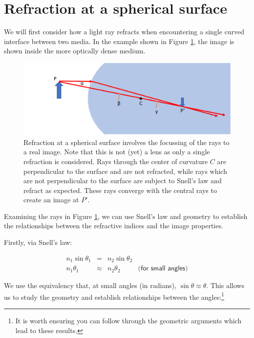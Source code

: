 \documentclass[
]{book}
\begin{document}
\hypertarget{sec-ch16-sphericalsurface1}{%
\section{Refraction at a spherical surface}\label{sec-ch16-sphericalsurface1}}

We will first consider how a light ray refracts when encountering a single curved interface between two media. In the example shown in Figure \ref{fig:ch16-sphericalsurface1}, the image is shown inside the more optically dense medium.

\begin{figure}

{\centering \includegraphics[width=0.7\linewidth]{visualisations/LaTeX/ch16-sphericalsurface} 

}

\caption{Refraction at a spherical surface involves the focussing of the rays to a real image. Note that this is not (yet) a lens as only a single refraction is considered. Rays through the center of curvature $C$ are perpendicular to the surface and are not refracted, while rays which are not perpendicular to the surface are subject to Snell's law and refract as expected. These rays converge with the central rays to create an image at $P'$.}\label{fig:ch16-sphericalsurface1}
\end{figure}

Examining the rays in Figure \ref{fig:ch16-sphericalsurface1}, we can use Snell's law and geometry to establish the relationships between the refractive indices and the image properties.

Firstly, via Snell's law:

\begin{equation}
\begin{array}{rcll}
n_1 \sin \theta_1 &=& n_2 \sin \theta_2 &\\
n_1 \theta_1 &\approx& n_2 \theta_2 & \textsf{(for small angles)}
\end{array}
\label{eq:ch16-lensequation1}
\end{equation}

We use the equivalency that, at small angles (in radians), \(\sin \theta \approx \theta\). This allows us to study the geometry and establish relationships between the angles:\footnote{It is worth ensuring you can follow through the geometric arguments which lead to these results.}
\end{document}
